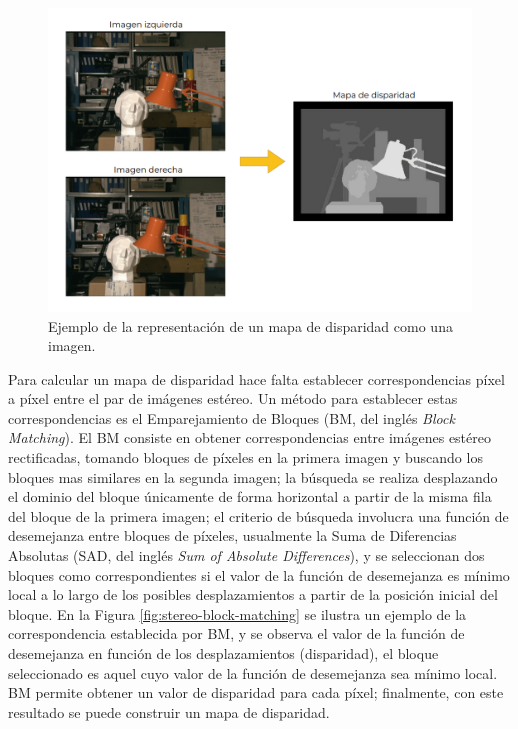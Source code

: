 \begin{figure}[H]
    \centering
    \includegraphics[scale=0.4]{partes/img/disparity-map.png}
    \caption[Ejemplo de la representación de un mapa de disparidad como una imagen.]{Ejemplo de la representación de un mapa de disparidad como una imagen\footnotemark.} 
    \label{fig:stereo-diparity-map}
\end{figure}

Para calcular un mapa de disparidad hace falta establecer correspondencias píxel a píxel entre el par de imágenes estéreo. Un método para establecer estas correspondencias es el Emparejamiento de Bloques \cite{Baudes2009} (BM, del inglés \textit{Block Matching}). El BM consiste en obtener correspondencias entre imágenes estéreo rectificadas, tomando bloques de píxeles en la primera imagen y buscando los bloques mas similares en la segunda imagen; la búsqueda se realiza desplazando el dominio del bloque únicamente de forma horizontal a partir de la misma fila del bloque de la primera imagen; el criterio de búsqueda involucra una función de desemejanza entre bloques de píxeles, usualmente la Suma de Diferencias Absolutas (SAD, del inglés \textit{Sum of Absolute Differences}), y se seleccionan dos bloques como correspondientes si el valor de la función de desemejanza es mínimo local a lo largo de los posibles desplazamientos a partir de la posición inicial del bloque. En la Figura \ref{fig:stereo-block-matching} se ilustra un ejemplo de la correspondencia establecida por BM, y se observa el valor de la función de desemejanza en función de los desplazamientos (disparidad), el bloque seleccionado es aquel cuyo valor de la función de desemejanza sea mínimo local. BM permite obtener un valor de disparidad para cada píxel; finalmente, con este resultado se puede construir un mapa de disparidad.

